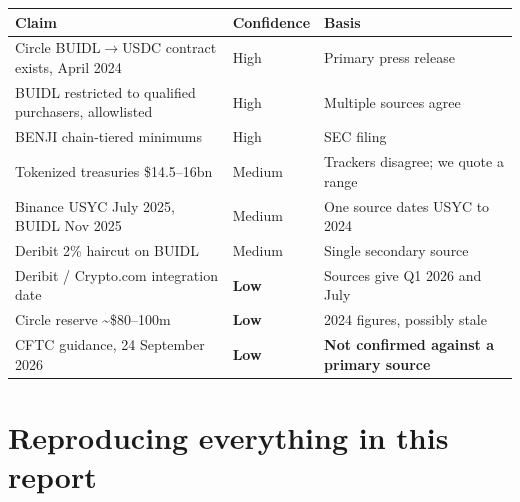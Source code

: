 \documentclass[11pt,a4paper]{article}
\begin{document}
\begin{center}
\small
\begin{tabular}{@{}p{7.4cm}lp{4.6cm}@{}}
\toprule
\textbf{Claim} & \textbf{Confidence} & \textbf{Basis} \\
\midrule
Circle BUIDL$\rightarrow$USDC contract exists, April 2024 & High & Primary press release~\cite{circle} \\
BUIDL restricted to qualified purchasers, allowlisted & High & Multiple sources agree \\
BENJI chain-tiered minimums & High & SEC filing~\cite{franklin} \\
Tokenized treasuries \$14.5--16bn & Medium & Trackers disagree; we quote a range \\
Binance USYC July 2025, BUIDL Nov 2025 & Medium & One source dates USYC to 2024 \\
Deribit 2\% haircut on BUIDL & Medium & Single secondary source \\
Deribit / Crypto.com integration date & \textbf{Low} & Sources give Q1 2026 and July \\
Circle reserve \textasciitilde\$80--100m & \textbf{Low} & 2024 figures, possibly stale \\
CFTC guidance, 24 September 2026 & \textbf{Low} & \textbf{Not confirmed against a primary source} \\
\bottomrule
\end{tabular}
\end{center}

\section{Reproducing everything in this report}\label{app:repro}
\end{document}
